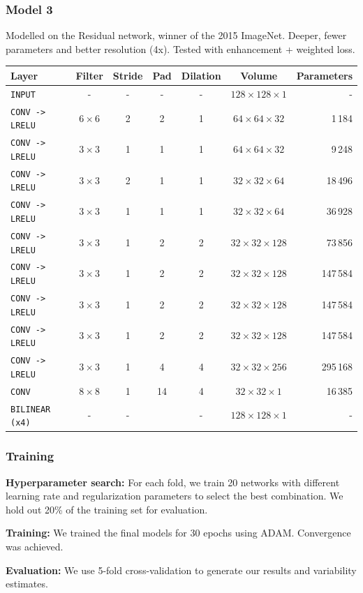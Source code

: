 \documentclass{beamer}
\begin{document}
	\begin{frame}
		\frametitle{Model 3}
		Modelled on the Residual network, winner of the 2015 ImageNet. Deeper, fewer parameters and better resolution (4x). Tested with enhancement + weighted loss.
		
		\footnotesize
		\begin{table}
			\centering
			\begin{tabular}{lcccccr}
			\hline
			\textbf{Layer} & \textbf{Filter} & \textbf{Stride} & \textbf{Pad} & \textbf{Dilation} & \textbf{Volume} & \textbf{Parameters} \\
			\hline
			\texttt{INPUT}	&- & -	& - & - & $128 \times 128 \times 1$ & -\\
			\texttt{CONV -> LRELU}	& $6 \times 6$ & 2 & 2 & 1 & $64 \times 64 \times 32$ & 1\,184\\
			\texttt{CONV -> LRELU}	& $3 \times 3$ & 1 & 1 & 1 & $64 \times 64 \times 32$ & 9\,248\\
			\texttt{CONV -> LRELU}	& $3 \times 3$ & 2 & 1 & 1 & $32 \times 32 \times 64$ & 18\,496\\
			\texttt{CONV -> LRELU}	& $3 \times 3$ & 1 & 1 & 1 & $32 \times 32 \times 64$ & 36\,928\\
			\texttt{CONV -> LRELU}	& $3 \times 3$ & 1 & 2 & 2 & $32 \times 32 \times 128$ & 73\,856\\
			\texttt{CONV -> LRELU}	& $3 \times 3$ & 1 & 2 & 2 & $32 \times 32 \times 128$ & 147\,584\\
			\texttt{CONV -> LRELU}	& $3 \times 3$ & 1 & 2 & 2 & $32 \times 32 \times 128$ & 147\,584\\
			\texttt{CONV -> LRELU}	& $3 \times 3$ & 1 & 2 & 2 & $32 \times 32 \times 128$ & 147\,584\\
			\texttt{CONV -> LRELU}	& $3 \times 3$ & 1 & 4 & 4 & $32 \times 32 \times 256$ & 295\,168\\
			\texttt{CONV}	& $8 \times 8$ & 1 & 14 & 4 & $32 \times 32 \times 1$ & 16\,385\\
			\texttt{BILINEAR (x4)}		& - & - && - & $128 \times 128 \times 1$ & -\\
			\hline
			\end{tabular}
		\end{table}
	\end{frame}
	
	\begin{frame}
	    \frametitle{Training}
	    \textbf{Hyperparameter search:} 
	    For each fold, we train 20 networks with different learning rate and regularization parameters to select the best combination. We hold out 20\% of the training set for evaluation.
	    
	    \medskip
	    \textbf{Training:}	    
	    We trained the final models for 30 epochs using ADAM. Convergence was achieved.
	    
	    \medskip
	    \textbf{Evaluation:}
	    We use 5-fold cross-validation to generate our results and variability estimates.
	    
	\end{frame}
\end{document}
